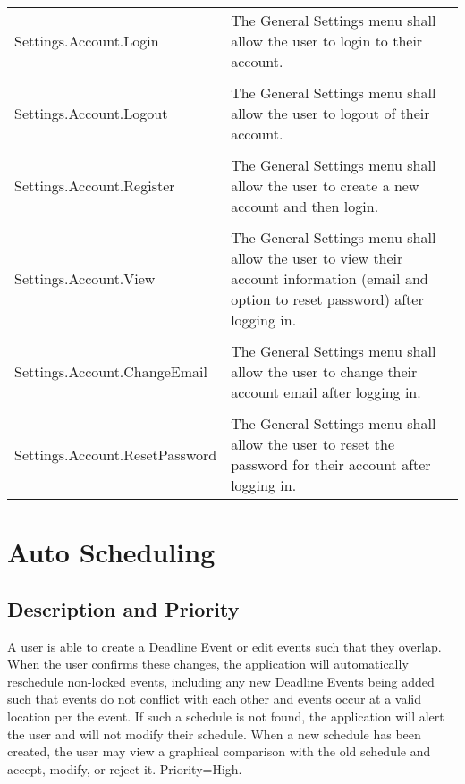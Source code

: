 \documentclass{scrreprt}
\begin{document}
\begin{center}
\begin{longtable}{ | p{6cm} | p{9cm} | }
\hline
Settings.Account.Login & The General Settings menu shall allow the user to login to their account. \\
& \\
Settings.Account.Logout & The General Settings menu shall allow the user to logout of their account. \\
& \\
Settings.Account.Register & The General Settings menu shall allow the user to create a new account and then login. \\
& \\
Settings.Account.View & The General Settings menu shall allow the user to view their account information (email and option to reset password) after logging in. \\
& \\
Settings.Account.ChangeEmail & The General Settings menu shall allow the user to change their account email after logging in. \\
& \\
Settings.Account.ResetPassword & The General Settings menu shall allow the user to reset the password for their account after logging in. \\
\hline
\end{longtable}
\end{center}

\section{Auto Scheduling}

\subsection{Description and Priority}
A user is able to create a Deadline Event or edit events such that they overlap.
When the user confirms these changes, the application will automatically reschedule
non-locked events, including any new Deadline Events being added such that events
do not conflict with each other and events occur at a valid location per the event.
If such a schedule is not found, the application will alert the user and will not
modify their schedule. When a new schedule has been created, the user may view a
graphical comparison with the old schedule and accept, modify, or reject it.
Priority=High.
\end{document}
